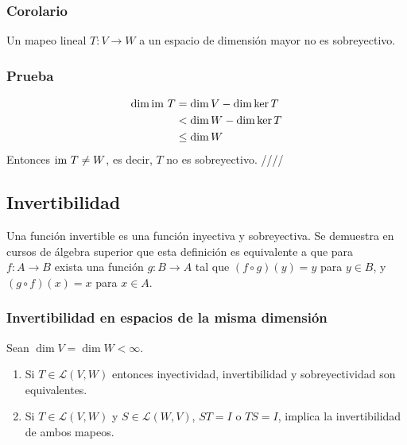 \documentclass{article}
\begin{document}
\subsubsection{Corolario}
Un mapeo lineal $T: V\rightarrow W$ a un espacio de dimensión mayor
no es sobreyectivo.

\subsubsection*{Prueba}
\begin{align*}
    \dim\text{im } T &= \dim V - \dim\ker T\\
    &< \dim W - \dim\ker T \\
    &\leq \dim W
\end{align*}
Entonces $\text{im } T \neq W$, es decir, $T$ no es sobreyectivo.
\hfill ////

\subsection{Invertibilidad}
Una función invertible es una función inyectiva y sobreyectiva.
Se demuestra en cursos de álgebra superior que esta definición es
equivalente a que para \\
$f:A\rightarrow B$ exista una función
$g:B\rightarrow A$ tal que $(f\circ g)(y) = y$ para $y\in B$,
y $(g\circ f)(x) = x$ para $x\in A$.
\newpage

\subsubsection{Invertibilidad en espacios de la misma dimensión}
Sean $\dim V = \dim W < \infty$.
\begin{enumerate}
    \item Si $T\in\mathcal{L}(V,W)$ entonces
    inyectividad, invertibilidad y sobreyectividad son equivalentes.
    \item Si $T\in\mathcal{L}(V,W)$ y $S\in\mathcal{L}(W,V)$,
    $ST=I$ o $TS=I$, implica la invertibilidad de ambos mapeos.
\end{enumerate}
\end{document}
